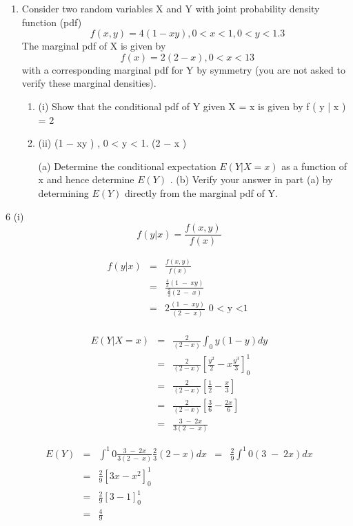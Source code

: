 \documentclass[a4paper,12pt]{article}
\begin{document}
\begin{enumerate}
\item %
Consider two random variables X and Y with joint probability density function (pdf)
\[f ( x , y ) =
4
(1 − xy ) , 0 < x < 1, 0 < y < 1 .
3\]
The marginal pdf of X is given by
\[f ( x ) =
2
(2 − x ) , 0 < x < 1
3\]
with a corresponding marginal pdf for Y by symmetry (you are not asked to verify
these marginal densities).
\begin{enumerate}
    \item (i)
Show that the conditional pdf of Y given X = x is given by
f ( y | x ) = 2
\item (ii)
(1 − xy )
, 0 < y < 1.
(2 − x )

(a) Determine the conditional expectation $E ( Y | X = x )$ as a function of x
and hence determine $E ( Y )$ .
(b) Verify your answer in part (a) by determining $E ( Y )$ directly from the
marginal pdf of Y.
\end{enumerate}
\end{enumerate}

\newpage
6
(i)
\[ f(y|x) = \frac{f(x,y)}{f(x)}\]

\begin{eqnarray*}
 f(y|x) &=& \frac{f(x,y)}{f(x)}  \\
 &=& \frac{  \frac{4}{3} (1\;-\;xy) }{\frac{2}{3} (2\;-\;x)  }  \\
 &=& 2 \frac{(1\;-\;xy)}{(2\;-\;x)} \mbox{ 0 < y <1 }  \\
 \end{eqnarray*}
 
 
 
 \begin{eqnarray*}
 E(Y|X=x) &=& \frac{2}{(2-x)} \int^{}_{0} y(1-y) dy \\
  &=& \frac{2}{(2-x)} \left[  \frac{y^2}{2} - x \frac{y^3}{3}\right]^{1}_{0} \\ 
  &=& \frac{2}{(2-x)} \left[  \frac{1}{2} -  \frac{x}{3}\right] \\ 
  &=& \frac{2}{(2-x)} \left[  \frac{3}{6} -  \frac{2x}{6}\right] \\ 
  &=& \frac{3\;-\;2x}{3(2\;-\;x)}
 \end{eqnarray*}
 
 \begin{eqnarray*}
 E(Y) &=& \int^{1}{0} \frac{3\;-\;2x}{3(2\;-\;x)} \frac{2}{3} (2-x) dx
 &=& \frac{2}{9} \int^{1}{0}  (3 \;-\;2x) dx \\
 &=&  \frac{2}{9}  \left[  3x - x^2 \right]^{1}_{0} \\
&=&  \frac{2}{9}  \left[  3- 1 \right]^{1}_{0} \\ 
&=& \frac{4}{9}
\end{eqnarray*}
\end{document}
